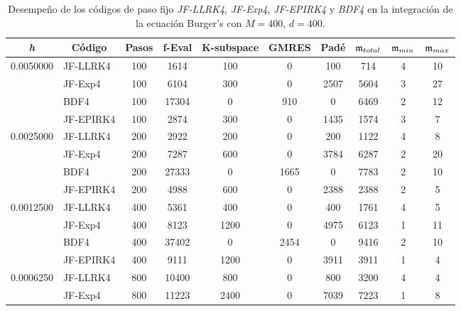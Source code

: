 \begin{table}[htb]
	\caption{Desempeño de los códigos de paso fijo \textit{JF-LLRK4}, \textit{JF-Exp4}, \textit{JF-EPIRK4} y \textit{BDF4} en la integración de la ecuación Burger's con $M=400$, $d=400$.}
	\centering
	\begin{adjustbox}{width=0.9\columnwidth,center}
		\begin{tabular}{cccccccccc}
			\hline
			\textit{h} & Código & Pasos & f-Eval & K-subspace & GMRES & Padé & $\mathfrak{m}_{total}$ & $\mf%
			_{min}$ & $\mathfrak{m}_{max}$ \\ \hline
			\multicolumn{1}{l}{0.0050000} & \multicolumn{1}{l}{JF-LLRK4} & 100 & 1614 &
			100 & 0 & 100 & 714 & 4 & 10 \\
			\multicolumn{1}{l}{} & \multicolumn{1}{l}{JF-Exp4} & 100 & 6104 & 300 & 0 &
			2507 & 5604 & 3 & 27 \\
			\multicolumn{1}{l}{} & \multicolumn{1}{l}{BDF4} & 100 & 17304 & 0 & 910 & 0
			& 6469 & 2 & 12 \\
			\multicolumn{1}{l}{} & \multicolumn{1}{l}{JF-EPIRK4} & 100 & 2874 & 300 & 0 &
			1435 & 1574 & 3 & 7 \\
			\multicolumn{1}{l}{0.0025000} & \multicolumn{1}{l}{JF-LLRK4} & 200 & 2922 &
			200 & 0 & 200 & 1122 & 4 & 8 \\
			\multicolumn{1}{l}{} & \multicolumn{1}{l}{JF-Exp4} & 200 & 7287 & 600 & 0 &
			3784 & 6287 & 2 & 20 \\
			\multicolumn{1}{l}{} & \multicolumn{1}{l}{BDF4} & 200 & 27333 & 0 & 1665 & 0
			& 7783 & 2 & 10 \\
			\multicolumn{1}{l}{} & \multicolumn{1}{l}{JF-EPIRK4} & 200 & 4988 & 600 & 0 &
			2388 & 2388 & 2 & 5 \\
			\multicolumn{1}{l}{0.0012500} & \multicolumn{1}{l}{JF-LLRK4} & 400 & 5361 &
			400 & 0 & 400 & 1761 & 4 & 5 \\
			\multicolumn{1}{l}{} & \multicolumn{1}{l}{JF-Exp4} & 400 & 8123 & 1200 & 0 &
			4975 & 6123 & 1 & 11 \\
			\multicolumn{1}{l}{} & \multicolumn{1}{l}{BDF4} & 400 & 37402 & 0 & 2454 & 0
			& 9416 & 2 & 10 \\
			\multicolumn{1}{l}{} & \multicolumn{1}{l}{JF-EPIRK4} & 400 & 9111 & 1200 & 0 &
			3911 & 3911 & 1 & 4 \\
			\multicolumn{1}{l}{0.0006250} & \multicolumn{1}{l}{JF-LLRK4} & 800 & 10400 &
			800 & 0 & 800 & 3200 & 4 & 4 \\
			\multicolumn{1}{l}{} & \multicolumn{1}{l}{JF-Exp4} & 800 & 11223 & 2400 & 0
			& 7039 & 7223 & 1 & 8 \\

\end{tabular}
\end{adjustbox}
\end{table}
